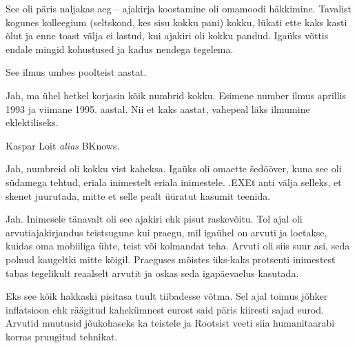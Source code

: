 See oli päris 
naljakas aeg -- ajakirja koostamine oli omamoodi 
häkkimine. Tavalist kogunes kolleegium (seltskond, kes sisu kokku pani) 
kokku, lükati ette kaks kasti õlut ja enne toast välja ei 
lastud, kui ajakiri oli kokku pandud. Igaüks võttis endale mingid kohustused 
ja kadus nendega tegelema.


See ilmus umbes poolteist aastat.


Jah, ma ühel hetkel korjasin kõik numbrid kokku. Esimene number ilmus aprillis 1993 ja viimane 
1995. aastal. Nii et kaks aastat, vahepeal läks ilmumine eklektiliseks.


Kaspar Loit \emph{alias} BKnows.


Jah, numbreid oli kokku vist kaheksa. Igaüks oli omaette šedööver, kuna see oli südamega tehtud, eriala inimestelt eriala inimestele. .EXEt anti välja selleks, et skenet juurutada, mitte et selle pealt 
üüratut kasumit teenida. 


Jah. Inimesele tänavalt
oli see ajakiri ehk pisut raskevõitu. Tol ajal oli 
arvutiajakirjandus teistsugune kui praegu, mil
igaühel on arvuti ja loetakse, kuidas oma mobiiliga 
ühte, teist või kolmandat teha. Arvuti oli siis suur asi, 
seda polnud kaugeltki mitte kõigil. Praeguses mõistes üks-kaks protsenti inimestest tabas tegelikult reaalselt arvutit ja oskas seda 
igapäevaelus kasutada.


Eks see kõik hakkaski pisitasa tuult tiibadesse võtma. Sel ajal toimus 
jõhker inflatsioon ehk räägitud kahekümnest eurost said päris kiiresti 
sajad eurod. Arvutid muutusid jõukohaseks ka teistele ja Rootsist veeti siia humanitaarabi korras pruugitud tehnikat.

